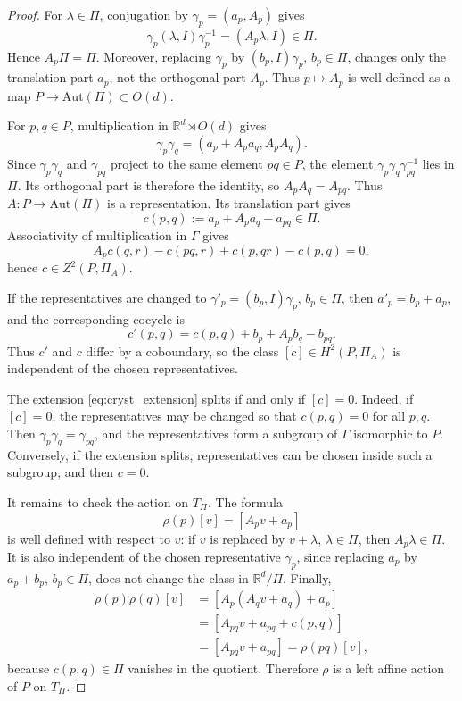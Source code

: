 \documentclass[11pt]{amsart}
\theoremstyle{plain}
\theoremstyle{definition}
\theoremstyle{remark}
\begin{document}
\begin{proof}
	For \(\lambda\in\Pi\), conjugation by \(\gamma_p=(a_p,A_p)\) gives
	\[
	\gamma_p(\lambda,I)\gamma_p^{-1}=(A_p\lambda,I)\in\Pi.
	\]
	Hence \(A_p\Pi=\Pi\). Moreover, replacing \(\gamma_p\) by \((b_p,I)\gamma_p\), \(b_p\in\Pi\), changes only the translation part \(a_p\), not the orthogonal part \(A_p\). Thus \(p\mapsto A_p\) is well defined as a map \(P\to\mathrm{Aut}(\Pi)\subset O(d)\).
	
	For \(p,q\in P\), multiplication in \(\mathbb R^d\rtimes O(d)\) gives
	\[
	\gamma_p\gamma_q
	=
	(a_p+A_pa_q,A_pA_q).
	\]
	Since \(\gamma_p\gamma_q\) and \(\gamma_{pq}\) project to the same element \(pq\in P\), the element \(\gamma_p\gamma_q\gamma_{pq}^{-1}\) lies in \(\Pi\). Its orthogonal part is therefore the identity, so \(A_pA_q=A_{pq}\). Thus \(A:P\to\mathrm{Aut}(\Pi)\) is a representation. Its translation part gives
	\[
	c(p,q):=a_p+A_pa_q-a_{pq}\in\Pi.
	\]
	Associativity of multiplication in \(\Gamma\) gives
	\[
	A_pc(q,r)-c(pq,r)+c(p,qr)-c(p,q)=0,
	\]
	hence \(c\in Z^2(P,\Pi_A)\).
	
	If the representatives are changed to \(\gamma'_p=(b_p,I)\gamma_p\), \(b_p\in\Pi\), then \(a'_p=b_p+a_p\), and the corresponding cocycle is
	\[
	c'(p,q)
	=
	c(p,q)+b_p+A_pb_q-b_{pq}.
	\]
	Thus \(c'\) and \(c\) differ by a coboundary, so the class \([c]\in H^2(P,\Pi_A)\) is independent of the chosen representatives.
	
	The extension \eqref{eq:cryst_extension} splits if and only if \([c]=0\). Indeed, if \([c]=0\), the representatives may be changed so that \(c(p,q)=0\) for all \(p,q\). Then \(\gamma_p\gamma_q=\gamma_{pq}\), and the representatives form a subgroup of \(\Gamma\) isomorphic to \(P\). Conversely, if the extension splits, representatives can be chosen inside such a subgroup, and then \(c=0\).
	
	It remains to check the action on \(T_\Pi\). The formula
	\[
	\rho(p)[v]=[A_pv+a_p]
	\]
	is well defined with respect to \(v\): if \(v\) is replaced by \(v+\lambda\), \(\lambda\in\Pi\), then \(A_p\lambda\in\Pi\). It is also independent of the chosen representative \(\gamma_p\), since replacing \(a_p\) by \(a_p+b_p\), \(b_p\in\Pi\), does not change the class in \(\mathbb R^d/\Pi\). Finally,
	\[
	\begin{aligned}
		\rho(p)\rho(q)[v]
		&=[A_p(A_qv+a_q)+a_p]  \\
		&=[A_{pq}v+a_{pq}+c(p,q)] \\
		&=[A_{pq}v+a_{pq}]
		=\rho(pq)[v],
	\end{aligned}
	\]
	because \(c(p,q)\in\Pi\) vanishes in the quotient. Therefore \(\rho\) is a left affine action of \(P\) on \(T_\Pi\).
\end{proof}
\end{document}
